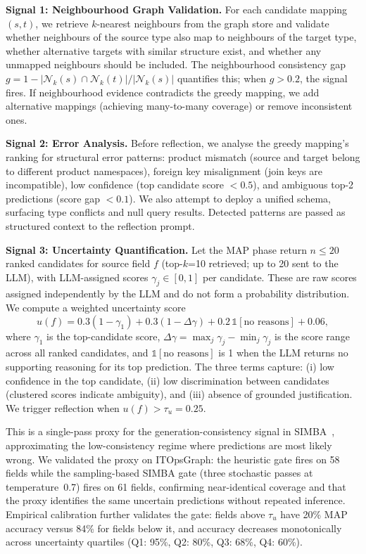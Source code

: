 \documentclass[sigconf, nonacm]{acmart}
\begin{document}
\textbf{Signal 1: Neighbourhood Graph Validation.} For each candidate mapping $(s, t)$, we retrieve $k$-nearest neighbours from the graph store and validate whether neighbours of the source type also map to neighbours of the target type, whether alternative targets with similar structure exist, and whether any unmapped neighbours should be included. The neighbourhood consistency gap $g = 1 - |\mathcal{N}_k(s) \cap \mathcal{N}_k(t)| / |\mathcal{N}_k(s)|$ quantifies this; when $g > 0.2$, the signal fires. If neighbourhood evidence contradicts the greedy mapping, we add alternative mappings (achieving many-to-many coverage) or remove inconsistent ones.

\textbf{Signal 2: Error Analysis.} Before reflection, we analyse the greedy mapping's ranking for structural error patterns: product mismatch (source and target belong to different product namespaces), foreign key misalignment (join keys are incompatible), low confidence (top candidate score $< 0.5$), and ambiguous top-2 predictions (score gap $< 0.1$). We also attempt to deploy a unified schema, surfacing type conflicts and null query results. Detected patterns are passed as structured context to the reflection prompt.

\textbf{Signal 3: Uncertainty Quantification.}
Let the MAP phase return $n \leq 20$ ranked candidates for source field $f$ (top-$k$=10 retrieved; up to 20 sent to the LLM), with LLM-assigned scores $\gamma_j \in [0,1]$ per candidate. These are raw scores assigned independently by the LLM and do not form a probability distribution. We compute a weighted uncertainty score
\begin{equation*}
u(f) = 0.3(1-\gamma_1) + 0.3(1 - \Delta\gamma) + 0.2\,\mathbb{1}[\text{no reasons}] + 0.06,
\end{equation*}
where $\gamma_1$ is the top-candidate score, $\Delta\gamma = \max_j \gamma_j - \min_j \gamma_j$ is the score range across all ranked candidates, and $\mathbb{1}[\text{no reasons}]$ is 1 when the LLM returns no supporting reasoning for its top prediction. The three terms capture: (i) low confidence in the top candidate, (ii) low discrimination between candidates (clustered scores indicate ambiguity), and (iii) absence of grounded justification. We trigger reflection when $u(f) > \tau_u = 0.25$.

This is a single-pass proxy for the generation-consistency signal in SIMBA~\cite{simba2025}, approximating the low-consistency regime where predictions are most likely wrong. We validated the proxy on ITOpsGraph: the heuristic gate fires on 58 fields while the sampling-based SIMBA gate (three stochastic passes at temperature~0.7) fires on 61 fields, confirming near-identical coverage and that the proxy identifies the same uncertain predictions without repeated inference. Empirical calibration further validates the gate: fields above $\tau_u$ have 20\% MAP accuracy versus 84\% for fields below it, and accuracy decreases monotonically across uncertainty quartiles (Q1: 95\%, Q2: 80\%, Q3: 68\%, Q4: 60\%).
\end{document}
